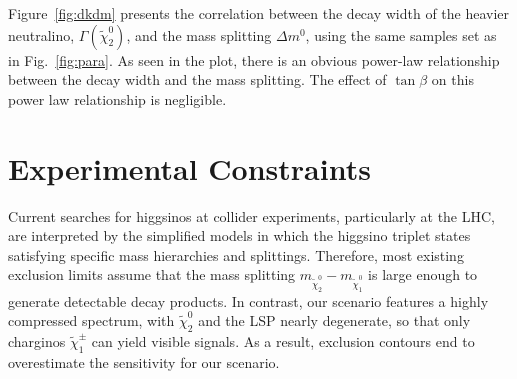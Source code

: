 \documentclass[letterpaper,11pt]{article}
\begin{document}
Figure~\ref{fig:dkdm} presents the correlation between the decay width of the heavier neutralino, $\Gamma\left(\tilde{\chi}_2^0\right)$, and the mass splitting $\Delta m^0$, using the same samples set as in Fig.~\ref{fig:para}. As seen in the plot, there is an obvious power-law relationship between the decay width and the mass splitting. The effect of $\tan\beta$ on this power law relationship is negligible. 

\section{Experimental Constraints}
\label{sec:exp}

Current searches for higgsinos at collider experiments, particularly at the LHC, are interpreted by the simplified models in which the higgsino triplet states satisfying specific mass hierarchies and splittings. Therefore, most existing exclusion limits assume that the mass splitting $m_{\tilde\chi_2^0} - m_{\tilde{\chi}_1^0}$ is large enough to generate detectable decay products. In contrast, our scenario features a highly compressed spectrum, with $\tilde{\chi}_2^0$ and the LSP nearly degenerate, so that only charginos $\tilde{\chi}_1^\pm$ can yield visible signals. As a result, exclusion contours end to overestimate the sensitivity for our scenario. 
\end{document}

